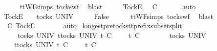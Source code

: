 \begin{isabellebody}
\ \ \ \ \isamarkupfalse%
\ ttWF{\isachardot}simps{\isacharparenleft}{}{\isacharparenright}\ tocks{\isacharunderscore}wf\ \isamarkupfalse%
\ blast\isanewline
\ \ \isamarkupfalse%
\ \isamarkupfalse%
\ {\isachardoublequoteopen}{\isacharbrackleft}Tock{\isacharbrackright}\isactrlsub E\ {\isacharhash}\ {\isasymrho}\ {\isasymlesssim}\isactrlsub C\ {\isasymsigma}{\isacharprime}{\isacharprime}{\isachardoublequoteclose}\isanewline
\ \ \ \ \isamarkupfalse%
\ auto\isanewline
{}\isamarkupfalse%
\isanewline
\ \ \isamarkupfalse%
\ {\isasymrho}\ {\isasymsigma}{\isacharprime}{\isacharprime}\isanewline
\ \ \isamarkupfalse%
\ {\isachardoublequoteopen}{\isacharbrackleft}Tock{\isacharbrackright}\isactrlsub E\ {\isacharhash}\ {\isasymsigma}{\isacharprime}{\isacharprime}\ {\isasymin}\ tocks\ UNIV{\isachardoublequoteclose}\isanewline
\ \ \isamarkupfalse%
\ \isamarkupfalse%
\ {\isachardoublequoteopen}False{\isachardoublequoteclose}\isanewline
\ \ \ \ \isamarkupfalse%
\ ttWF{\isachardot}simps{\isacharparenleft}{}{\isacharparenright}\ tocks{\isacharunderscore}wf\ \isamarkupfalse%
\ blast\isanewline
\ \ \isamarkupfalse%
\ \isamarkupfalse%
\ {\isachardoublequoteopen}{\isasymrho}\ {\isasymlesssim}\isactrlsub C\ {\isacharbrackleft}Tock{\isacharbrackright}\isactrlsub E\ {\isacharhash}\ {\isasymsigma}{\isacharprime}{\isacharprime}{\isachardoublequoteclose}\isanewline
\ \ \ \ \isamarkupfalse%
\ auto\isanewline
{}\isamarkupfalse%
%
\endisatagproof
{\isafoldproof}%
%
\isadelimproof
\isanewline
%
\endisadelimproof
\isanewline
{}\isamarkupfalse%
\ longest{\isacharunderscore}pretocks{\isacharunderscore}tt{\isacharunderscore}prefix{\isacharunderscore}subset{\isacharunderscore}split{\isacharcolon}\isanewline
\ \ \ {\isachardoublequoteopen}{\isasymrho}\ {\isasymin}\ tocks\ UNIV{\isachardoublequoteclose}\ {\isachardoublequoteopen}{\isasymforall}t{\isasymin}tocks\ UNIV{\isachardot}\ t\ {\isasymle}\isactrlsub C\ {\isasymrho}\ {\isacharat}\ {\isasymsigma}\ {\isasymlongrightarrow}\ t\ {\isasymle}\isactrlsub C\ {\isasymrho}{\isachardoublequoteclose}\isanewline
\ \ \ {\isachardoublequoteopen}{\isasymexists}{\isasymrho}{\isacharprime}\ {\isasymsigma}{\isacharprime}{\isachardot}\ {\isasymrho}{\isacharprime}\ {\isasymin}\ tocks\ UNIV\ {\isasymand}\ \isanewline
\ \ \ \ {\isacharparenleft}{\isasymforall}t{\isasymin}tocks\ UNIV{\isachardot}\ t\ {\isasymle}\isactrlsub C\ {\isasymrho}{\isacharprime}\ {\isacharat}\ {\isasymsigma}{\isacharprime}\ {\isasymlongrightarrow}\ t\ {\isasymle}\isactrlsub C\ {\isasymrho}{\isacharprime}{\isacharparenright}\ {\isasymand}\ \isanewline

\end{isabellebody}
